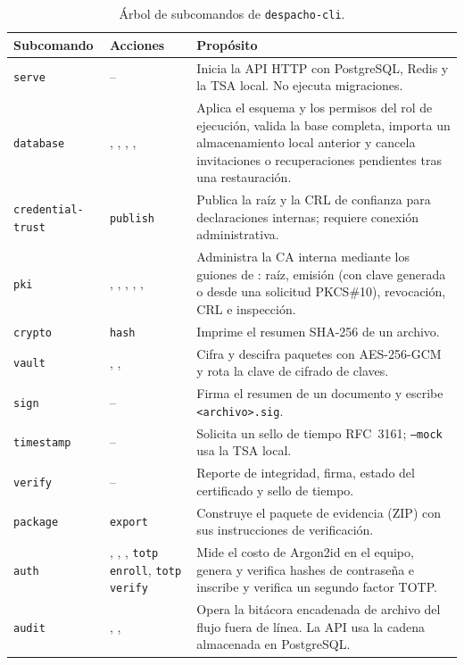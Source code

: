 \begin{table}[H]
  \centering
  \caption{Árbol de subcomandos de \texttt{despacho-cli}.}\label{tab:cli-despacho}
  \small
  \begin{tabularx}{\textwidth}{L{2.9cm} L{4.6cm} Y}
    \toprule
    \textbf{Subcomando} & \textbf{Acciones} & \textbf{Propósito} \\
    \midrule
    \texttt{serve} & --
      & Inicia la API HTTP con PostgreSQL, Redis y la TSA local. No ejecuta
        migraciones. \\
    \texttt{database}
      & , , ,
        ,
      & Aplica el esquema y los permisos del rol de ejecución, valida la base
        completa, importa un almacenamiento local anterior y cancela
        invitaciones o recuperaciones pendientes tras una restauración. \\
    \texttt{credential-trust} & \texttt{publish}
      & Publica la raíz y la CRL de confianza para declaraciones internas;
        requiere conexión administrativa. \\
    \texttt{pki}
      & , , ,
        , , 
      & Administra la CA interna mediante los guiones de :
        raíz, emisión (con clave generada o desde una solicitud PKCS\#10),
        revocación, CRL e inspección. \\
    \texttt{crypto} & \texttt{hash}
      & Imprime el resumen SHA-256 de un archivo. \\
    \texttt{vault}
      & , , 
      & Cifra y descifra paquetes con AES-256-GCM y rota la clave de cifrado
        de claves. \\
    \texttt{sign} & --
      & Firma el resumen de un documento y escribe \texttt{<archivo>.sig}. \\
    \texttt{timestamp} & --
      & Solicita un sello de tiempo RFC~3161; \texttt{--mock} usa la TSA
        local. \\
    \texttt{verify} & --
      & Reporte de integridad, firma, estado del certificado y sello de
        tiempo. \\
    \texttt{package} & \texttt{export}
      & Construye el paquete de evidencia (ZIP) con sus instrucciones de
        verificación. \\
    \texttt{auth}
      & , ,
        , \texttt{totp enroll}, \texttt{totp verify}
      & Mide el costo de Argon2id en el equipo, genera y verifica hashes de
        contraseña e inscribe y verifica un segundo factor TOTP. \\
    \texttt{audit}
      & , , 
      & Opera la bitácora encadenada de archivo del flujo fuera de línea. La
        API usa la cadena almacenada en PostgreSQL. \\
    \bottomrule
  \end{tabularx}
\end{table}

